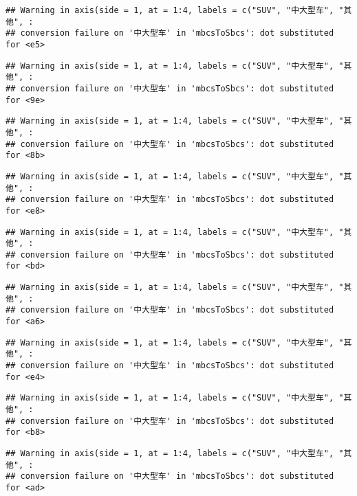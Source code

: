 \documentclass[]{article}
\begin{document}
\begin{verbatim}
## Warning in axis(side = 1, at = 1:4, labels = c("SUV", "中大型车", "其他", :
## conversion failure on '中大型车' in 'mbcsToSbcs': dot substituted for <e5>
\end{verbatim}

\begin{verbatim}
## Warning in axis(side = 1, at = 1:4, labels = c("SUV", "中大型车", "其他", :
## conversion failure on '中大型车' in 'mbcsToSbcs': dot substituted for <9e>
\end{verbatim}

\begin{verbatim}
## Warning in axis(side = 1, at = 1:4, labels = c("SUV", "中大型车", "其他", :
## conversion failure on '中大型车' in 'mbcsToSbcs': dot substituted for <8b>
\end{verbatim}

\begin{verbatim}
## Warning in axis(side = 1, at = 1:4, labels = c("SUV", "中大型车", "其他", :
## conversion failure on '中大型车' in 'mbcsToSbcs': dot substituted for <e8>
\end{verbatim}

\begin{verbatim}
## Warning in axis(side = 1, at = 1:4, labels = c("SUV", "中大型车", "其他", :
## conversion failure on '中大型车' in 'mbcsToSbcs': dot substituted for <bd>
\end{verbatim}

\begin{verbatim}
## Warning in axis(side = 1, at = 1:4, labels = c("SUV", "中大型车", "其他", :
## conversion failure on '中大型车' in 'mbcsToSbcs': dot substituted for <a6>
\end{verbatim}

\begin{verbatim}
## Warning in axis(side = 1, at = 1:4, labels = c("SUV", "中大型车", "其他", :
## conversion failure on '中大型车' in 'mbcsToSbcs': dot substituted for <e4>
\end{verbatim}

\begin{verbatim}
## Warning in axis(side = 1, at = 1:4, labels = c("SUV", "中大型车", "其他", :
## conversion failure on '中大型车' in 'mbcsToSbcs': dot substituted for <b8>
\end{verbatim}

\begin{verbatim}
## Warning in axis(side = 1, at = 1:4, labels = c("SUV", "中大型车", "其他", :
## conversion failure on '中大型车' in 'mbcsToSbcs': dot substituted for <ad>
\end{verbatim}
\end{document}
